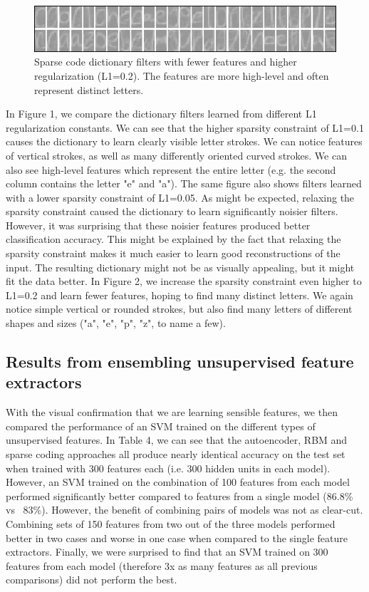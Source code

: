 \documentclass{article} %
\begin{document}
\begin{figure}
\centering
\includegraphics[scale=1]{figures/filters_50.png}
\caption{Sparse code dictionary filters with fewer features and higher regularization (L1=0.2). The features are more high-level and often represent distinct letters.}
\end{figure}

In Figure 1, we compare the dictionary filters learned from different L1 regularization constants. We can see that the higher sparsity constraint of L1=0.1 causes the dictionary to learn clearly visible letter strokes. We can notice features of vertical strokes, as well as many differently oriented curved strokes. We can also see high-level features which represent the entire letter (e.g. the second column contains the letter "e" and "a"). The same figure also shows filters learned with a lower sparsity constraint of L1=0.05. As might be expected, relaxing the sparsity constraint caused the dictionary to learn significantly noisier filters. However, it was surprising that these noisier features produced better classification accuracy. This might be explained by the fact that relaxing the sparsity constraint makes it much easier to learn good reconstructions of the input. The resulting dictionary might not be as visually appealing, but it might fit the data better. In Figure 2, we increase the sparsity constraint even higher to L1=0.2 and learn fewer features, hoping to find many distinct letters. We again notice simple vertical or rounded strokes, but also find many letters of different shapes and sizes ("a", "e", "p", "z", to name a few).


\subsection{Results from ensembling unsupervised feature extractors}
With the visual confirmation that we are learning sensible features, we then compared the performance of an SVM trained on the different types of unsupervised features. In Table 4, we can see that the autoencoder, RBM and sparse coding approaches all produce nearly identical accuracy on the test set when trained with 300 features each (i.e. 300 hidden units in each model). However, an SVM trained on the combination of 100 features from each model performed significantly better compared to features from a single model (86.8\% vs ~83\%). However, the benefit of combining pairs of models was not as clear-cut. Combining sets of 150 features from two out of the three models performed better in two cases and worse in one case when compared to the single feature extractors. Finally, we were surprised to find that an SVM trained on 300 features from each model (therefore 3x as many features as all previous comparisons) did not perform the best.
\end{document}
